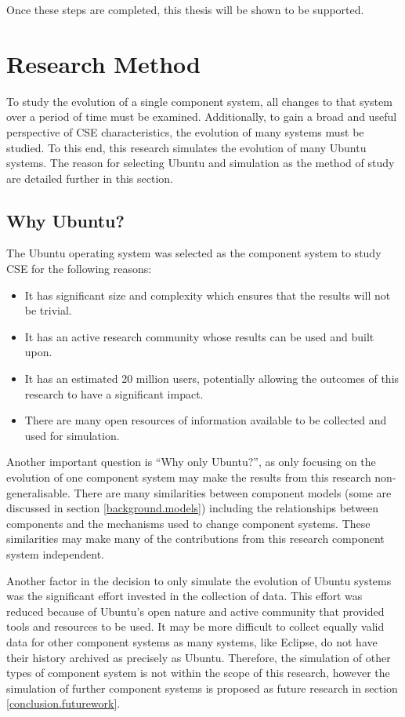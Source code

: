 Once these steps are completed, this thesis will be shown to be supported.  

\section{Research Method}
To study the evolution of a single component system, all changes to that system over a period of time must be examined.
Additionally, to gain a broad and useful perspective of CSE characteristics, the evolution of many systems must be studied.
To this end, this research simulates the evolution of many Ubuntu systems.
The reason for selecting Ubuntu and simulation as the method of study are detailed further in this section.

\subsection{Why Ubuntu?}
The Ubuntu operating system was selected as the component system to study CSE for the following reasons:
\begin{itemize}
  \item It has significant size and complexity which ensures that the results will not be trivial.
  \item It has an active research community whose results can be used and built upon.
  \item It has an estimated 20 million users, potentially allowing the outcomes of this research to have a significant impact.
  \item There are many open resources of information available to be collected and used for simulation.
\end{itemize} 

Another important question is ``Why only Ubuntu?'', 
as only focusing on the evolution of one component system may make the results from this research non-generalisable.
There are many similarities between component models (some are discussed in section \ref{background.models})
including the relationships between components and the mechanisms used to change component systems.
These similarities may make many of the contributions from this research component system independent.

Another factor in the decision to only simulate the evolution of Ubuntu systems was the significant effort invested in the collection of data.
This effort was reduced because of Ubuntu's open nature and active community that provided tools and resources to be used.
It may be more difficult to collect equally valid data for other component systems as
many systems, like Eclipse, do not have their history archived as precisely as Ubuntu.
Therefore, the simulation of other types of component system is not within the scope of this research,
however the simulation of further component systems is proposed as future research in section \ref{conclusion.futurework}.

